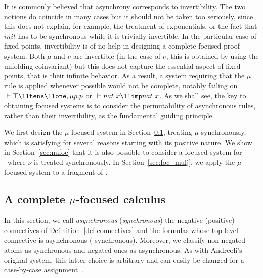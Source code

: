 It is commonly believed that asynchrony corresponds to invertibility.
The two notions do coincide in many cases but it should not be taken too
seriously, since this does not explain, for example,
the treatment of exponentials,
or the fact that $init$ has to be synchronous while it is trivially
invertible.
In the particular case of fixed points,
invertibility is of no help in designing a complete focused proof system.
Both $\mu$ and $\nu$ are invertible (in the case of $\nu$, this is
obtained by using the unfolding coinvariant) but
this does not capture the essential aspect of fixed points, that is
their infinite behavior.
As a result, a system requiring that the $\mu$ rule is applied
whenever possible would not be complete, notably failing
on $\;\vdash \top \lltens \llone, \mu p. p$ or $\;\vdash nat~x \llimp nat~x$.
As we shall see, the key to obtaining focused systems is to consider
the permutability of asynchronous rules, rather than their invertibility,
as the fundamental guiding principle.

We first design the $\mu$-focused system in Section~\ref{sec:mufoc},
treating $\mu$ synchronously,
which is satisfying for several reasons starting with its positive nature.
We show in Section~\ref{sec:nufoc} that it is also possible to consider
a focused system for \mumall\ where $\nu$ is treated synchronously.
In Section~\ref{sec:foc_mulj}, we apply the $\mu$-focused system
to a fragment of \muLJ.

\subsection{A complete $\mu$-focused calculus} \label{sec:mufoc}

In this section,
we call \emph{asynchronous} (\resp \emph{synchronous})
the negative (\resp positive) connectives of Definition~\ref{def:connectives}
and the formulas whose top-level connective is asynchronous (\resp 
synchronous).
Moreover, we classify non-negated atoms as synchronous and negated
ones as asynchronous. As with Andreoli's original system, this latter choice
is arbitrary and can easily be changed for a case-by-case 
assignment~\cite{miller07cslb,chaudhuri08jar}.

